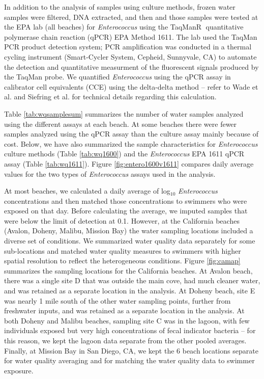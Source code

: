 \documentclass[12pt]{article}\usepackage[]{graphicx}\usepackage[]{color}
\begin{document}
In addition to the analysis of samples using culture methods, frozen water samples were filtered, DNA extracted, and then and those samples were tested at the EPA lab (all beaches) for \textit{Enterococcus} using the TaqMan\textcircled{R} quantitative polymerase chain reaction (qPCR) EPA Method 1611.\supercite{Epa2012-fb} The lab used the TaqMan PCR product detection system; PCR amplification was conducted in a thermal cycling instrument (Smart-Cycler System, Cepheid, Sunnyvale, CA) to automate the detection and quantitative measurment of the fluorescent signals produced by the TaqMan probe. We quantified \textit{Enterococcus} using the qPCR assay in calibrator cell equivalents (CCE) using the delta-delta method -- refer to Wade et al.\supercite{Wade2010-bb} and Siefring et al.\supercite{Siefring2008-au} for technical details regarding this calculation.  

Table \ref{tab:wqsamplesum} summarizes the number of water samples analyzed using the different assays at each beach. At some beaches there were fewer samples analyzed using the qPCR assay than the culture assay mainly because of cost. Below, we have also summarized the sample characteristics for \emph{Enterococcus} culture methods (Table \ref{tab:wq1600}) and the \emph{Enterococcus} EPA 1611 qPCR assay (Table \ref{tab:wq1611}). Figure \ref{fig:entero1600v1611} compares daily average values for the two types of \textit{Enterococcus} assays used in the analysis.

At most beaches, we calculated a daily average of log$_{10}$ \textit{Enterococcus} concentrations and then matched those concentrations to swimmers who were exposed on that day.  Before calculating the average, we imputed samples that were below the limit of detection at 0.1.  However, at the California beaches (Avalon, Doheny, Malibu, Mission Bay) the water sampling locations included a diverse set of conditions. We summarized water quality data separately for some sub-locations and matched water quality measures to swimmers with higher spatial resolution to reflect the heterogeneous conditions. Figure \ref{fig:camap} summarizes the sampling locations for the California beaches. At Avalon beach, there was a single site D that was outside the main cove, had much cleaner water, and was retained as a separate location in the analysis.  At Doheny beach,  site E was nearly 1 mile south of the other water sampling points, further from freshwater inputs, and was retained as a separate location in the analysis. At both Doheny and Malibu beaches, sampling site C was in the lagoon, with few individuals exposed but very high concentrations of fecal indicator bacteria -- for this reason, we kept the lagoon data separate from the other pooled averages. Finally, at Mission Bay in San Diego, CA, we kept the 6 beach locations separate for water quality averaging and for matching the water quality data to swimmer exposure. 
\end{document}
